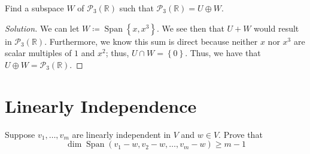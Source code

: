 \documentclass{article}
\newenvironment{solution}{\begin{proof}[Solution]}{\end{proof}}
\newcommand{\RR}{\mathbb{R}}
\DeclareMathOperator*{\Span}{Span}
\begin{document}
	\begin{hw}
		Find a subspace $W$ of $\mathscr{P}_{3}(\RR)$ such that $\mathscr{P}_{3}(\RR) = U \oplus W$.
	\end{hw}
	\begin{solution}
		We can let $W \coloneq \Span\left\{  x, x^{3} \right\}$. We see then that $U + W$ would result in $\mathscr{P}_{3}(\RR)$. Furthermore, we know this sum is direct because neither $x$ nor $x^{3}$ are scalar multiples of $1$ and $x^{2}$; thus, $U \cap W = \left\{  0 \right\}$. Thus, we have that $U \oplus W = \mathscr{P}_{3}(\RR)$.
	\end{solution}

	\newpage
	
	\section{Linearly Independence}
	\begin{hw}
		Suppose $v_1, \ldots, v_m$ are linearly independent in $V$ and $w\in V$. Prove that
		\begin{equation*}
			\dim \Span (v_{1} - w, v_{2} - w, \ldots, v_{m} - w) \geq m -1
		\end{equation*}
	\end{hw}
\end{document}
